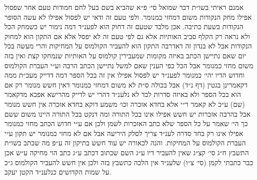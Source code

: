 \documentclass[12pt, openany]{book}
\begin{document}
\begin{multicols}{2}
אמנם ראיתי בשו״ת דבר שמואל סי׳ פ״א שהביא בשם בעל לחם חמודות טעם אחר שפסול אפילו מחק הנקודות משום דמחזי כמנומר. ולפי טעם זה ודאי יש לפסול אפילו לא עשה הסופר הנקודות בשעת כתיבה. אכן מלבד שטעם זה דחוק הוא לפענ״ד דמה נימור יש כשמחק הכל ולא נראה רק הקלף סביב האותיות אלא גם לפי טעם זה לא יפסל אלא אם התקון הוא למחוק הנקודות אבל לא בנדון זה דאדרבה התקון הוא להעביר הקולמוס על המחיקות והרי מעשה בכל יום שאם נתיישן הכתב באיזה מקומות שמעבירין קולמוס על האותיות שנמחקו קצת ואין בזה משום מחזי כמנומר אבל הכל כפי הענין שאם למשל נתיישן הכתב הרבה וע״י העברת הקולמוס וחדוש הדיו יהי׳ כמנומר לפענ״ד יש לפסול אפילו אין זה בכל הספר דמה דדייק מעכ״ת ממה דקאמרינן בגטין (דף נ״ד) אבל בכולה ס״ת לא משום דמחזי כמנומר דאין חשש מנומר רק אם הוא בכל הספר ולא באיזה סדרות לבד לא נלענ״ד דהרי יש לדייק מהרישא אפכא מדקאמר (שם) ע״כ לא קאמר ר״י אלא בחדא אזכרה וכו׳ משמע דוקא בחדא אזכרה אין חשש מנומר אבל בהרבה אזכרות יש חשש אפילו אינו בכל התורה ומה דנקט בכל התורה היינו משום ששם כך הי׳ שאמר על כל הספר שלא כתב האזכרות לשמן ולכן אם ע״י חדוש הכתב מחזי כמנומר אפילו אינו רק בחד סדרה לענ״ד צריך לסלק היריעה אבל אם לא מחזי כמנומר יש תקון ע״י העברת הקולמוס על המחיקות. והנה לכאורה יש עוד חשש בתיקון זה ע״פ מה שכתב בשו״ת התשבץ ח״ג סי׳ קצ״ג שאין להעביר דיו ע״ג השם שכתוב דכתב ע״ג כתב הוי מחיקה ע״ש אכן כבר כתבתי לקמן (סי׳ צ״ו) שלענ״ד אין הלכה כתשבץ בזה ולכן אין חשש להעביר הקולמוס ג״כ על שמות הקדושים כנלענ״ד הקטן יעקב.\\\vspace{0pt}

\end{multicols}\newpage
\end{document}
